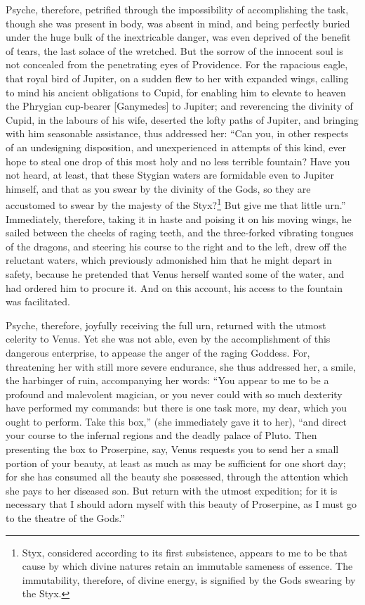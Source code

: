 \documentclass{article}
\begin{document}
Psyche, therefore, petrified through the impossibility of accomplishing the
task, though she was present in body, was absent in mind, and being perfectly
buried under the huge bulk of the inextricable danger, was even deprived of the
benefit of tears, the last solace of the wretched. But the sorrow of the
innocent soul is not concealed from the penetrating eyes of Providence. For the
rapacious eagle, that royal bird of Jupiter, on a sudden flew to her with
expanded wings, calling to mind his ancient obligations to Cupid, for enabling
him to elevate to heaven the Phrygian cup-bearer [Ganymedes] to Jupiter; and
reverencing the divinity of Cupid, in the labours of his wife, deserted the
lofty paths of Jupiter, and bringing with him seasonable assistance, thus
addressed her: ``Can you, in other respects of an undesigning disposition, and
unexperienced in attempts of this kind, ever hope to steal one drop of this
most holy and no less terrible fountain? Have you not heard, at least, that
these Stygian waters are formidable even to Jupiter himself, and that as you
swear by the divinity of the Gods, so they are accustomed to swear by the
majesty of the Styx?\footnote{Styx, considered according to its first
subsistence, appears to me to be that cause by which divine natures retain an
immutable sameness of essence. The immutability, therefore, of divine energy,
is signified by the Gods swearing by the Styx.} But give me that little urn.''
Immediately, therefore, taking it in haste and poising it on his moving wings,
he sailed between the cheeks of raging teeth, and the three-forked vibrating
tongues of the dragons, and steering his course to the right and to the left,
drew off the reluctant waters, which previously admonished him that he might
depart in safety, because he pretended that Venus herself wanted some of the
water, and had ordered him to procure it. And on this account, his access to
the fountain was facilitated.

Psyche, therefore, joyfully receiving the full urn, returned with the utmost
celerity to Venus. Yet she was not able, even by the accomplishment of this
dangerous enterprise, to appease the anger of the raging Goddess. For,
threatening her with still more severe endurance, she thus addressed her, a
smile, the harbinger of ruin, accompanying her words: ``You appear to me to be
a profound and malevolent magician, or you never could with so much dexterity
have performed my commands: but there is one task more, my dear, which you
ought to perform. Take this box,'' (she immediately gave it to her), ``and
direct your course to the infernal regions and the deadly palace of Pluto. Then
presenting the box to Proserpine, say, Venus requests you to send her a small
portion of your beauty, at least as much as may be sufficient for one short
day; for she has consumed all the beauty she possessed, through the attention
which she pays to her diseased son. But return with the utmost expedition; for
it is necessary that I should adorn myself with this beauty of Proserpine, as I
must go to the theatre of the Gods.''
\end{document}
